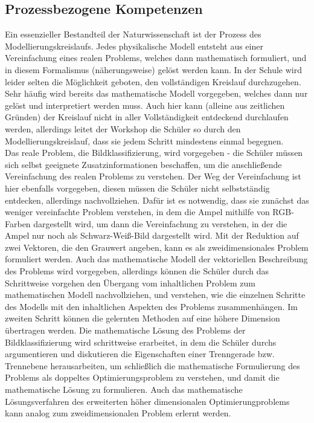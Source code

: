         \subsection{Prozessbezogene Kompetenzen}
       Ein essenzieller Bestandteil der Naturwissenschaft ist der Prozess des Modellierungskreislaufs. Jedes physikalische Modell entsteht aus einer Vereinfachung eines realen Problems, welches dann mathematisch formuliert, und in diesem Formalismus (näherungsweise) gelöst werden kann.
       In der Schule wird leider selten die Möglichkeit geboten, den vollständigen Kreislauf durchzugehen. Sehr häufig wird bereits das mathematische Modell vorgegeben, welches dann \glqq{}nur\grqq{} gelöst und interpretiert werden muss.
       Auch hier kann (alleine aus zeitlichen Gründen) der Kreislauf nicht in aller Vollständigkeit entdeckend durchlaufen werden, allerdings leitet der Workshop die Schüler so durch den Modellierungskreislauf, dass sie jedem Schritt mindestens einmal begegnen. \\
            Das reale Problem, die Bildklassifizierung, wird vorgegeben - die Schüler müssen sich selbst geeignete Zusatzinformationen beschaffen, um die anschließende Vereinfachung des realen Problems zu verstehen.
            Der Weg der Vereinfachung ist hier ebenfalls vorgegeben, diesen müssen die Schüler nicht selbstständig entdecken, allerdings nachvollziehen. Dafür ist es notwendig, dass sie zunächst das weniger vereinfachte Problem verstehen, in dem die Ampel mithilfe von RGB-Farben dargestellt wird, um dann die Vereinfachung zu verstehen, in der die Ampel nur noch als Schwarz-Weiß-Bild dargestellt wird.
            Mit der Reduktion auf zwei Vektoren, die den Grauwert angeben, kann es als zweidimensionales Problem formuliert werden.
            Auch das mathematische Modell der vektoriellen Beschreibung des Problems wird vorgegeben, allerdings können die Schüler durch das Schrittweise vorgehen den Übergang vom inhaltlichen Problem zum mathematischen Modell nachvollziehen, und verstehen, wie die einzelnen Schritte des Modells mit den inhaltlichen Aspekten des Problems zusammenhängen. Im zweiten Schritt können die gelernten Methoden auf eine höhere Dimension übertragen werden.
            Die mathematische Lösung des Problems der Bildklassifizierung wird schrittweise erarbeitet, in dem die Schüler durchs argumentieren und diskutieren die Eigenschaften einer Trenngerade bzw. Trennebene herausarbeiten, um schließlich die mathematische Formulierung des Problems als doppeltes Optimierungsproblem zu verstehen, und damit die mathematische Lösung zu formulieren. Auch das mathematische Lösungsverfahren des erweiterten höher dimensionalen Optimierungproblems kann analog zum zweidimensionalen Problem erlernt werden. 
